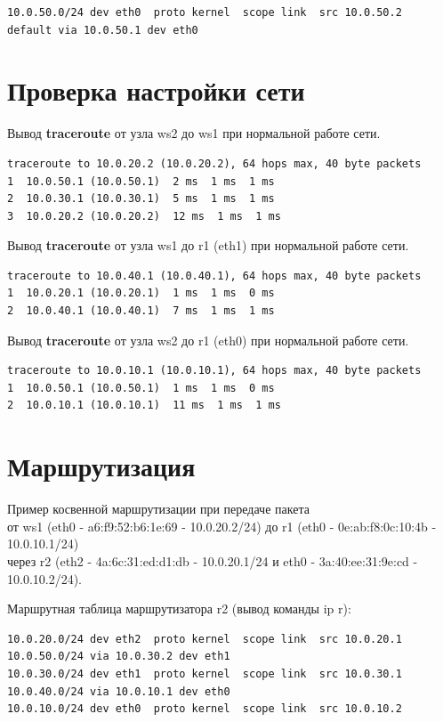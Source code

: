 \documentclass[a4paper,12pt]{article}
\begin{document}
\begin{Verbatim}
10.0.50.0/24 dev eth0  proto kernel  scope link  src 10.0.50.2 
default via 10.0.50.1 dev eth0 
\end{Verbatim}

\section{Проверка настройки сети}

Вывод \textbf{traceroute} от узла ws2 до ws1 при нормальной работе сети.

\begin{Verbatim}
traceroute to 10.0.20.2 (10.0.20.2), 64 hops max, 40 byte packets
1  10.0.50.1 (10.0.50.1)  2 ms  1 ms  1 ms
2  10.0.30.1 (10.0.30.1)  5 ms  1 ms  1 ms
3  10.0.20.2 (10.0.20.2)  12 ms  1 ms  1 ms
\end{Verbatim}

Вывод \textbf{traceroute} от узла ws1 до r1 (eth1) при нормальной работе сети.

\begin{Verbatim}
traceroute to 10.0.40.1 (10.0.40.1), 64 hops max, 40 byte packets
1  10.0.20.1 (10.0.20.1)  1 ms  1 ms  0 ms
2  10.0.40.1 (10.0.40.1)  7 ms  1 ms  1 ms
\end{Verbatim}

Вывод \textbf{traceroute} от узла ws2 до r1 (eth0) при нормальной работе сети.

\begin{Verbatim}
traceroute to 10.0.10.1 (10.0.10.1), 64 hops max, 40 byte packets
1  10.0.50.1 (10.0.50.1)  1 ms  1 ms  0 ms
2  10.0.10.1 (10.0.10.1)  11 ms  1 ms  1 ms
\end{Verbatim}


\section{Маршрутизация}

Пример косвенной маршрутизации при передаче пакета \\
от ws1 (eth0 - a6:f9:52:b6:1e:69 - 10.0.20.2/24) 
до r1 (eth0 - 0e:ab:f8:0c:10:4b - 10.0.10.1/24)\\
через r2 (eth2 - 4a:6c:31:ed:d1:db - 10.0.20.1/24 и eth0 - 3a:40:ee:31:9e:cd - 10.0.10.2/24).

Маршрутная таблица маршрутизатора r2 (вывод команды ip r):

\begin{Verbatim}
10.0.20.0/24 dev eth2  proto kernel  scope link  src 10.0.20.1 
10.0.50.0/24 via 10.0.30.2 dev eth1 
10.0.30.0/24 dev eth1  proto kernel  scope link  src 10.0.30.1 
10.0.40.0/24 via 10.0.10.1 dev eth0 
10.0.10.0/24 dev eth0  proto kernel  scope link  src 10.0.10.2 
\end{Verbatim}
\end{document}

